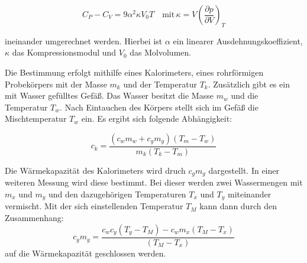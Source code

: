 \begin{equation}
\label{eq:umrechnung_cp_cv}
C_P-C_V=9\alpha^2\kappa V_0 T \quad \text{mit} \, \kappa=V\left(\frac{\partial p}{\partial V}\right)_T
\end{equation}

ineinander umgerechnet werden.
Hierbei ist $\alpha$ ein linearer Ausdehnungskoeffizient, $\kappa$ das Kompressionsmodul und %
$V_0$ das Molvolumen.

Die Bestimmung erfolgt mithilfe eines Kalorimeters,
eines rohrförmigen Probekörpers mit der Masse $m_k$ und der Temperatur %
$T_k$. Zusätzlich gibt es ein mit Wasser gefülltes Gefäß.
Das Wasser besitzt die Masse $m_w$ und die Temperatur $T_w$.
Nach Eintauchen des Körpers stellt sich im Gefäß die
Mischtemperatur $T_w$ ein.
Es ergibt sich folgende Abhängigkeit:

\begin{equation*}
\label{eq:zusammenhang_ck}
c_k=\frac{\left(c_wm_w+c_gm_g\right)\left(T_m-T_w\right)}{m_k\left(T_k-T_m\right)}
\end{equation*}

Die Wärmekapazität des Kalorimeters wird druch $c_gm_g$ dargestellt. %
In einer weiteren Messung wird diese bestimmt. %
Bei dieser werden zwei Wassermengen mit $m_x$ und $m_y$ und den
dazugehörigen Temperaturen $T_x$ und $T_y$ miteinander vermischt.
Mit der sich einstellenden Temperatur $T_M$ kann dann
durch den Zusammenhang:
\begin{equation}
\label{eq:zusammenhang_cgmg}
c_gm_g=\frac{c_wc_y\left(T_y-T_M\right)-c_wm_x\left(T_M-T_x\right)}{\left(T_M-T_x\right)}
\end{equation}
auf die Wärmekapazität geschlossen werden.

